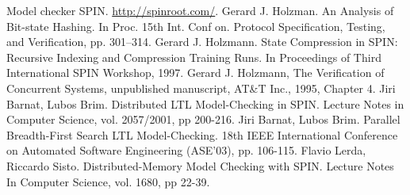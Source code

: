 \begin{thebibliography}{99}

 Model checker SPIN. \url{http://spinroot.com/}.
 Gerard J. Holzman. An Analysis of Bit-state
  Hashing. In Proc. 15th Int. Conf on. Protocol Specification,
  Testing, and Verification, pp. 301–314.
 Gerard J. Holzmann. State Compression in SPIN: Recursive
  Indexing and Compression Training Runs. In Proceedings of Third International
  SPIN Workshop, 1997.
 Gerard J. Holzmann, The Verification of Concurrent Systems,
  unpublished manuscript, AT\&T Inc., 1995, Chapter 4.
 Jiri Barnat, Lubos Brim. Distributed LTL
  Model-Checking in SPIN. Lecture Notes in Computer Science,
  vol. 2057/2001, pp 200-216.
 Jiri Barnat, Lubos Brim. Parallel Breadth-First Search
  LTL Model-Checking. 18th IEEE International Conference on Automated
  Software Engineering (ASE'03), pp. 106-115.
 Flavio Lerda, Riccardo Sisto. Distributed-Memory Model
  Checking with SPIN. Lecture Notes In Computer Science, vol. 1680, pp
  22-39.
\end{thebibliography}


